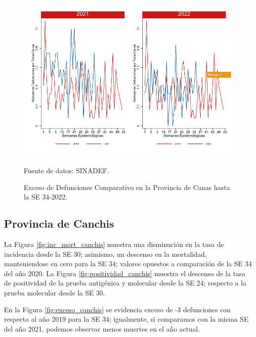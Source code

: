 \documentclass[12pt,a4paper,openany]{book}
\begin{document}
	\begin{figure}[h]
		\caption{Exceso de Defunciones Comparativo en la Provincia de Canas hasta la SE 34-2022.}\label{fig:exceso_canas}
		\begin{center}
			\includegraphics[width=0.7\linewidth]{../figuras/exceso_4.pdf}
		\end{center}
		{\footnotesize {Fuente de datos: SINADEF.}}
	\end{figure}
	
	\clearpage
	
	\subsection*{Provincia de Canchis}
	\noindent La Figura \ref{fig:inc_mort_canchis} muestra una disminución en la tasa de incidencia desde la SE 30; asimismo, un descenso en la mortalidad, manteniendose en cero para la SE 34; valores opuestos a comparación de la SE 34 del año 2020.
	\noindent La Figura \ref{fig:positividad_canchis} muestra el descenso de la tasa de positividad de la prueba antigénica  y molecular desde la SE 24; respecto a la prueba molecular desde la SE 30.
	
	En la Figura \ref{fig:exceso_canchis} se evidencia exceso de -3 defunciones con respecto al año 2019 para la SE 34; igualmente, si comparamos con la misma SE del año 2021, podemos observar menos muertes en el año actual.
	
\end{document}
